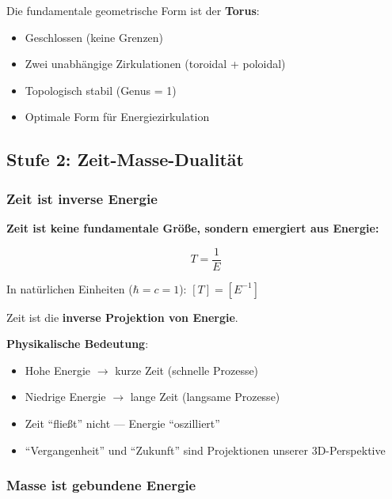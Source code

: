 	Die fundamentale geometrische Form ist der \textbf{Torus}:
	\begin{itemize}
		\item Geschlossen (keine Grenzen)
		\item Zwei unabhängige Zirkulationen (toroidal + poloidal)
		\item Topologisch stabil (Genus = 1)
		\item Optimale Form für Energiezirkulation
	\end{itemize}

	\subsection{Stufe 2: Zeit-Masse-Dualität}

	\subsubsection{Zeit ist inverse Energie}

	\begin{keyresult}
		\textbf{Zeit ist keine fundamentale Größe, sondern emergiert aus Energie:}

		\begin{equation}
			\boxed{T = \frac{1}{E}}
		\end{equation}

		In natürlichen Einheiten ($\hbar = c = 1$): $[T] = [E^{-1}]$

		\vspace{0.3cm}

		Zeit ist die \textbf{inverse Projektion von Energie}.
	\end{keyresult}

	\textbf{Physikalische Bedeutung}:
	\begin{itemize}
		\item Hohe Energie $\to$ kurze Zeit (schnelle Prozesse)
		\item Niedrige Energie $\to$ lange Zeit (langsame Prozesse)
		\item Zeit \enquote{fließt} nicht — Energie \enquote{oszilliert}
		\item \enquote{Vergangenheit} und \enquote{Zukunft} sind Projektionen unserer 3D-Perspektive
	\end{itemize}

	\subsubsection{Masse ist gebundene Energie}

